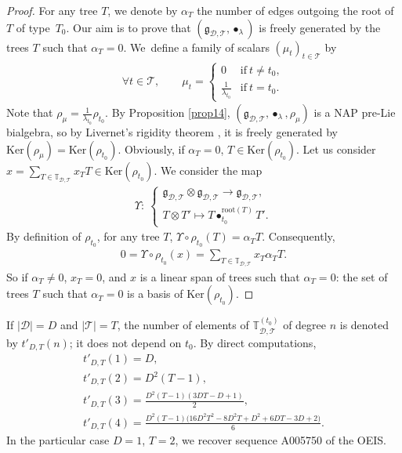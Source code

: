 \documentclass[pdftex]{sigma}
\numberwithin{equation}{section}
\newcommand{\T}{\mathcal{T}}
\newcommand{\D}{\mathcal{D}}
\newcommand{\g}{\mathfrak{g}}
\newcommand{\bfT}{\mathbb{T}}
\renewcommand{\ker}{\mathrm{Ker}}
\begin{document}
\begin{proof} For any tree $T$, we denote by $\alpha_T$ the number of edges outgoing the root of $T$ of type~$T_0$.
Our aim is to prove that $(\g_{\D,\T},\bullet_\lambda)$ is freely generated by the trees $T$ such that $\alpha_T=0$.
We~define a family of scalars $(\mu_t)_{t\in \T}$ by
\begin{align*}
\forall t\in \T,\qquad \mu_t=\begin{cases}
0&\mbox{if}\ t\neq t_0,\\
\displaystyle \frac{1}{\lambda_{t_0}}& \mbox{if}\ t=t_0.
\end{cases}\end{align*}
Note that $ \rho_\mu=\frac{1}{\lambda_{t_0}} \rho_{t_0}$.
By Proposition \ref{prop14}, $(\g_{\D,\T},\bullet_\lambda,\rho_\mu)$ is a NAP pre-Lie bialgebra,
so by Livernet's rigidity theorem \cite{Livernet}, it is freely generated by $\ker(\rho_\mu)=\ker(\rho_{t_0})$.
Obviously, if $\alpha_T=0$, $T\in \ker(\rho_{t_0})$.
Let us consider $ x=\sum_{T\in \bfT_{\D,\T}} x_T T\in \ker(\rho_{t_0})$. We consider the map
\begin{gather*}
\Upsilon\colon\ \begin{cases}
\g_{\D,\T}\otimes \g_{\D,\T} \longrightarrow \g_{\D,\T},
\\
T\otimes T' \longmapsto T\bullet_{t_0}^{\mathrm{root}(T)}T'.
\end{cases}
\end{gather*}
By definition of $\rho_{t_0}$, for any tree $T$, $\Upsilon \circ \rho_{t_0}(T)=\alpha_T T$. Consequently,
\begin{gather*}
0=\Upsilon \circ \rho_{t_0}(x)=\sum_{T\in \bfT_{\D,\T}} x_T\alpha_TT.
\end{gather*}
So if $\alpha_T\neq 0$, $x_T=0$, and $x$ is a linear span of trees such that $\alpha_T=0$:
the set of trees $T$ such that $\alpha_T=0$ is a basis of $\ker(\rho_{t_0})$.
\end{proof}

If $|\D|=D$ and $|\T|=T$, the number of elements of $\bfT_{\D,\T}^{(t_0)}$
of degree $n$ is denoted by $t'_{D,T}(n)$;
it does not depend on $t_0$. By direct computations,
\begin{gather*}
t'_{D,T}(1)=D,
\\
t'_{D,T}(2)=D^2(T-1),
\\
t'_{D,T}(3)=\frac{D^2(T-1)(3DT-D+1)}{2},
\\
t'_{D,T}(4)=\frac{D^2(T-1)\big(16D^2T^2-8D^2T+D^2+6DT-3D+2\big)}{6}.
\end{gather*}
In the particular case $D=1$, $T=2$, we recover sequence A005750 of the OEIS.
\end{document}
